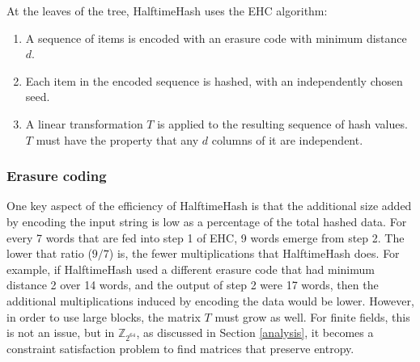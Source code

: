 \documentclass[runningheads]{llncs}
\newcommand{\ints}{\mathbb{Z}}
\begin{document}
At the leaves of the tree, HalftimeHash uses the EHC algorithm: \cite{ehc-nandi}

\begin{enumerate}
\item A sequence of items is encoded with an erasure code with minimum distance $d$.
\item Each item in the encoded sequence is hashed, with an independently chosen seed.
\item A linear transformation $T$ is applied to the resulting sequence of hash values.
  $T$ must have the property that any $d$ columns of it are independent.
\end{enumerate}



\subsubsection{Erasure coding}

One key aspect of the efficiency of HalftimeHash is that the additional size added by encoding the input string is low as a percentage of the total hashed data.
For every 7 words that are fed into step 1 of EHC, 9 words emerge from step 2.
The lower that ratio ($9/7$) is, the fewer multiplications that HalftimeHash does.
For example, if HalftimeHash used a different erasure code that had minimum distance 2 over 14 words, and the output of step 2 were 17 words, then the additional multiplications induced by encoding the data would be lower.
However, in order to use large blocks, the matrix $T$ must grow as well.
For finite fields, this is not an issue, but in $\ints_{2^{64}}$, as discussed in Section \ref{analysis}, it becomes a constraint satisfaction problem to find matrices that preserve entropy.
\end{document}

